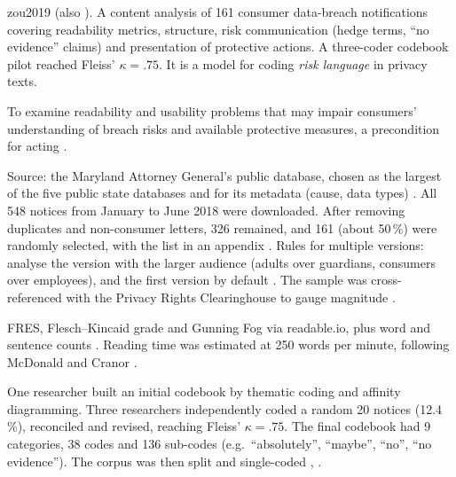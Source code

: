 \begin{papercard}{zou2019}
    (also ). A content analysis of 161 consumer data-breach notifications covering readability metrics, structure, risk communication (hedge terms, ``no evidence'' claims) and presentation of protective actions. A three-coder codebook pilot reached Fleiss' $\kappa=.75$. It is a model for coding \emph{risk language} in privacy texts.

 To examine readability and usability problems that may impair consumers' understanding of breach risks and available protective measures, a precondition for acting .

 Source: the Maryland Attorney General's public database, chosen as the largest of the five public state databases and for its metadata (cause, data types) . All 548 notices from January to June 2018 were downloaded. After removing duplicates and non-consumer letters, 326 remained, and 161 (about 50\,\%) were randomly selected, with the list in an appendix . Rules for multiple versions: analyse the version with the larger audience (adults over guardians, consumers over employees), and the first version by default . The sample was cross-referenced with the Privacy Rights Clearinghouse to gauge magnitude .

 FRES, Flesch--Kincaid grade and Gunning Fog via readable.io, plus word and sentence counts . Reading time was estimated at 250 words per minute, following McDonald and Cranor .

 One researcher built an initial codebook by thematic coding and affinity diagramming. Three researchers independently coded a random 20 notices (12.4\,\%), reconciled and revised, reaching Fleiss' $\kappa=.75$. The final codebook had 9 categories, 38 codes and 136 sub-codes (e.g.\ ``absolutely'', ``maybe'', ``no'', ``no evidence''). The corpus was then split and single-coded , .


\end{papercard}
